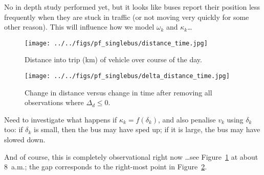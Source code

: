 \documentclass[10pt,a4paper]{article}
\begin{document}
No in depth study performed yet, but it looks like buses report their position less 
frequently when they are stuck in traffic (or not moving very quickly for some other
reason).
This will influence how we model $\omega_k$ and $\kappa_k$\ldots




\begin{figure}[hb!]
  \centering
  \texttt{[image: ../../figs/pf\_singlebus/distance\_time.jpg]}
  \caption{Distance into trip (km) of vehicle over course of the day.}
  \label{fig:distance-time}
\end{figure}

\begin{figure}[tbp]
  \centering
  \texttt{[image: ../../figs/pf\_singlebus/delta\_distance\_time.jpg]}
  \caption{Change in distance versus change in time after removing all observations where $\Delta_d \leq 0$.}
  \label{fig:delta-distance-time}
\end{figure}


Need to investigate what happens if $\kappa_k = f(\delta_k)$,
and also penalise $v_k$ using $\delta_k$ too: if $\delta_k$ is small, 
then the bus may have sped up; if it is large, the bus may have slowed down.

And of course, this is completely observational right now \ldots see Figure~\ref{fig:distance-time}
at about 8~a.m.; the gap corresponds to the right-most point in Figure~\ref{fig:delta-distance-time}.
\end{document}
